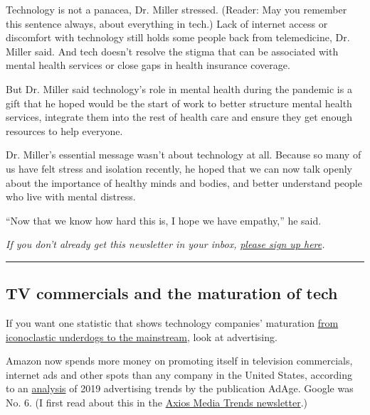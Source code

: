 Technology is not a panacea, Dr. Miller stressed. (Reader: May you
remember this sentence always, about everything in tech.) Lack of
internet access or discomfort with technology still holds some people
back from telemedicine, Dr. Miller said. And tech doesn't resolve the
stigma that can be associated with mental health services or close gaps
in health insurance coverage.

But Dr. Miller said technology's role in mental health during the
pandemic is a gift that he hoped would be the start of work to better
structure mental health services, integrate them into the rest of health
care and ensure they get enough resources to help everyone.

Dr. Miller's essential message wasn't about technology at all. Because
so many of us have felt stress and isolation recently, he hoped that we
can now talk openly about the importance of healthy minds and bodies,
and better understand people who live with mental distress.

``Now that we know how hard this is, I hope we have empathy,'' he said.

\emph{If you don't already get this newsletter in your inbox,}
\href{https://www.nytimes3xbfgragh.onion/newsletters/signup/OT}{\emph{please
sign up here}}\emph{.}

\begin{center}\rule{0.5\linewidth}{\linethickness}\end{center}

\hypertarget{tv-commercials-and-the-maturation-of-tech}{%
\subsection{TV commercials and the maturation of
tech}\label{tv-commercials-and-the-maturation-of-tech}}

If you want one statistic that shows technology companies' maturation
\href{https://www.nytimes3xbfgragh.onion/2020/06/22/technology/big-tech-underdogs.html}{from
iconoclastic underdogs to the mainstream}, look at advertising.

Amazon now spends more money on promoting itself in television
commercials, internet ads and other spots than any company in the United
States, according to an
\href{https://s3-prod.adage.com/s3fs-public/2020-07/lnafp_aa_20200713_locked.pdf}{analysis}
of 2019 advertising trends by the publication AdAge. Google was No. 6.
(I first read about this in the
\href{https://www.axios.com/newsletters/axios-media-trends-d14d7aa7-b160-4449-b01d-447b83fa18e5.html}{Axios
Media Trends newsletter}.)


